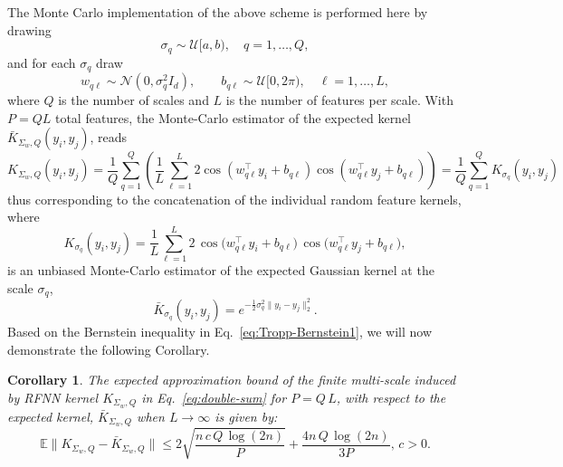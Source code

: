 \documentclass{article}
\newtheorem{corollary}{Corollary}
\begin{document}
The Monte Carlo implementation of the above scheme is performed here by drawing
\begin{equation}
\sigma_q \sim \mathcal{U}[a,b),\quad q=1,\dots,Q,
\end{equation}
and for each $\sigma_q$ draw
\begin{equation}
w_{q\ell}\sim \mathcal{N}(0,\sigma_q^2 I_d),\qquad
b_{q\ell}\sim \mathcal{U}[0,2\pi),\quad \ell=1,\dots,L,
\end{equation}
where $Q$ is the number of scales and $L$ is the number of features per scale. With $P=Q L$ total features, the Monte-Carlo estimator of the expected kernel $\bar{K}_{\Sigma_w,Q}(y_i,y_j)$, reads
\begin{equation}\label{eq:double-sum}
K_{\Sigma_w,Q}(y_i,y_j)
=\frac{1}{Q}\sum_{q=1}^{Q}\left(\frac{1}{L}\sum_{\ell=1}^{L}
2\cos(w_{q\ell}^\top y_i+b_{q\ell})\cos(w_{q\ell}^\top y_j+b_{q\ell})\right) =\frac{1}{Q} \sum_{q=1}^{Q} K_{\sigma_q}(y_i, y_j)\,
\end{equation}
thus corresponding to the concatenation of the individual random feature kernels, where
\begin{equation}
K_{\sigma_q}(y_i, y_j)=
\frac{1}{L}\sum_{\ell=1}^{L}
2\,\cos\big(w_{q\ell}^\top y_i + b_{q\ell}\big)\, \cos\big(w_{q\ell}^\top y_j + b_{q\ell}\big),
\end{equation}
is an unbiased Monte-Carlo estimator of the expected Gaussian kernel at the scale $\sigma_q$,
\begin{equation}
\bar{K}_{\sigma_q}(y_i, y_j)=
e^{-\tfrac{1}{2}\sigma_q^2 \|y_i - y_j\|_2^2}.
\end{equation}
Based on the Bernstein inequality \cite{tropp2015introduction} in Eq.~\eqref{eq:Tropp-Bernstein1}, we will now demonstrate the following Corollary.
\begin{corollary}
The expected approximation bound of the finite multi-scale induced by RFNN kernel $K_{\Sigma_w,Q}$ in Eq.~\eqref{eq:double-sum} for $P=Q\, L$, with respect to the expected kernel, $\bar{K}_{\Sigma_w,Q}$ when $L\to \infty$ is given by:
\begin{equation}
\mathbb{E} \big\| K_{\Sigma_w,Q} - \bar{K}_{\Sigma_w,Q} \big\| \le
2\sqrt{\frac{n \, c\, Q\, \log(2n)}{P}}
+
\frac{4 n\,Q\, \log(2n)}{3 P}, \, c>0.
\label{eq:boundmultikernel}
\end{equation}
\end{corollary}
\end{document}
